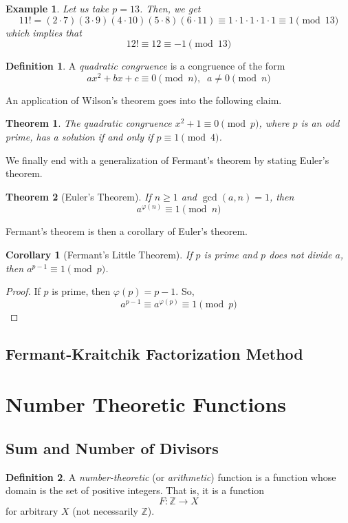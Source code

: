 \documentclass{article}
\newtheorem{theorem}{Theorem}[section]
\newtheorem{example}{Example}[section]
\newtheorem{corollary}{Corollary}[theorem]
\theoremstyle{remark}
\theoremstyle{definition}
\newtheorem{definition}{Definition}[section]
\begin{document}
\begin{example}
Let us take $p=13$. Then, we get 
\[11! = (2 \cdot 7) (3 \cdot 9) (4 \cdot 10) (5 \cdot 8) (6 \cdot 11) \equiv 1 \cdot 1 \cdot 1 \cdot 1 \cdot 1 \equiv 1 \pmod{13}\]
which implies that 
\[12! \equiv 12 \equiv -1 \pmod{13}\]
\end{example}

\begin{definition}
A \textit{quadratic congruence} is a congruence of the form 
\[a x^2 + bx + c \equiv 0 \pmod{n}, \;\; a \neq 0 \pmod{n}\]
\end{definition}

An application of Wilson's theorem goes into the following claim. 

\begin{theorem}
The quadratic congruence $x^2 + 1 \equiv 0 \pmod{p}$, where $p$ is an odd prime, has a solution if and only if $p \equiv 1 \pmod{4}$. 
\end{theorem}

We finally end with a generalization of Fermant's theorem by stating Euler's theorem. 

\begin{theorem}[Euler's Theorem]
If $n \geq 1$ and $\gcd(a, n) = 1$, then 
\[a^{\varphi(n)} \equiv 1 \pmod{n}\]
\end{theorem}

Fermant's theorem is then a corollary of Euler's theorem. 

\begin{corollary}[Fermant's Little Theorem]
If $p$ is prime and $p$ does not divide $a$, then $a^{p-1} \equiv 1 \pmod{p}$. 
\end{corollary}
\begin{proof}
If $p$ is prime, then $\varphi(p) = p-1$. So, 
\[a^{p-1} \equiv a^{\varphi(p)} \equiv 1 \pmod{p}\]
\end{proof}

\subsection{Fermant-Kraitchik Factorization Method}


\section{Number Theoretic Functions}
\subsection{Sum and Number of Divisors}
\begin{definition}
A \textit{number-theoretic} (or \textit{arithmetic}) function is a function whose domain is the set of positive integers. That is, it is a function 
\[F: \mathbb{Z} \longrightarrow X\]
for arbitrary $X$ (not necessarily $\mathbb{Z}$). 
\end{definition}
\end{document}
